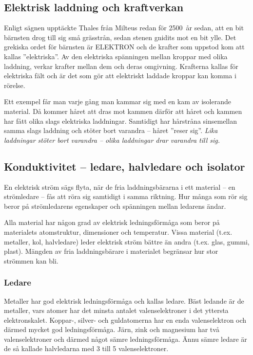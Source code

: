 \subsection{Elektrisk laddning och kraftverkan}
\frdjp
{}

Enligt sägnen upptäckte Thales från Milteus redan för 2500~år sedan, att en bit
bärnsten drog till sig små grässtrån, sedan stenen gnidits mot en bit ylle.
Det grekiska ordet för bärnsten är ELEKTRON och de krafter som uppstod kom att
kallas ''elektriska''.
Av den elektriska spänningen mellan kroppar med olika laddning, verkar krafter
mellan dem och deras omgivning.
Krafterna kallas för elektriska fält och är det som gör att elektriskt laddade
kroppar kan komma i rörelse.

Ett exempel får man varje gång man kammar sig med en kam av isolerande material.
Då kommer håret att dras mot kammen därför att håret och kammen har
fått olika slags elektriska laddningar.
Samtidigt har hårstråna sinsemellan samma slags laddning och stöter bort
varandra -- håret ''reser sig''.
\emph{Lika laddningar stöter bort varandra -- olika laddningar drar varandra till sig.}

\subsection{Konduktivitet -- ledare, halvledare och isolator}

En elektrisk ström sägs flyta, när de fria laddningsbärarna i ett material -- en
strömledare -- fås att röra sig samtidigt i samma riktning.
Hur många som rör sig beror på strömledarens egenskaper och spänningen mellan
ledarens ändar.

Alla material har någon grad av elektrisk ledningsförmåga som beror på
materialets atomstruktur, dimensioner och temperatur.
Vissa material (t.ex. metaller, kol, halvledare) leder elektrisk ström bättre
än andra (t.ex. glas, gummi, plast).
Mängden av fria laddningsbärare i materialet begränsar hur stor strömmen kan
bli.

\subsubsection{Ledare}

Metaller har god elektrisk ledningsförmåga och kallas ledare.
Bäst ledande är de metaller, vars atomer har det minsta antalet
valenselektroner i det yttersta elektronskalet.
Koppar-, silver- och guldatomerna har en enda valenselektron och därmed mycket
god ledningsförmåga.
Järn, zink och magnesium har två valenselektroner och därmed något sämre
ledningsförmåga.
Ännu sämre ledare är de så kallade halvledarna med 3 till 5 valenselektroner.

